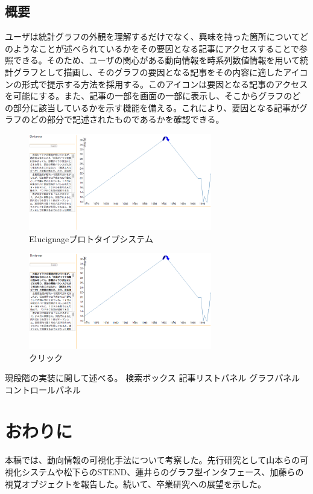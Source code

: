\documentclass{matsushita-zemi}
\begin{document}
\subsection{概要}
ユーザは統計グラフの外観を理解するだけでなく、興味を持った箇所についてどのようなことが述べられているかをその要因となる記事にアクセスすることで参照できる。そのため、ユーザの関心がある動向情報を時系列数値情報を用いて統計グラフとして描画し、そのグラフの要因となる記事をその内容に適したアイコンの形式で提示する方法を採用する。このアイコンは要因となる記事のアクセスを可能にする。また、記事の一部を画面の一部に表示し、そこからグラフのどの部分に該当しているかを示す機能を備える。これにより、要因となる記事がグラフのどの部分で記述されたものであるかを確認できる。
\begin{figure}[tb]
  \begin{center}
   \includegraphics[width=8cm,bb=0 0 852 448]{Elucignageprototype.png}
  \end{center}
 \caption{Elucignageプロトタイプシステム}
 \label{Elucignage}
\end{figure}
\begin{figure}[tb]
  \begin{center}
   \includegraphics[width=8cm,bb=0 0 853 448]{Elucignage_click.png}
  \end{center}
 \caption{クリック}
 \label{Elucignage}
\end{figure}
現段階の実装に関して述べる。
検索ボックス
記事リストパネル
グラフパネル
コントロールパネル

\section{おわりに}
本稿では、動向情報の可視化手法について考察した。先行研究として山本らの可視化システムや松下らのSTEND、蓮井らのグラフ型インタフェース、加藤らの視覚オブジェクトを報告した。続いて、卒業研究への展望を示した。



\end{document}
